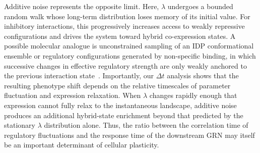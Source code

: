 \documentclass[11pt]{article}
\begin{document}
Additive noise represents the opposite limit. Here, $\lambda$ undergoes a bounded random walk whose long-term distribution loses memory of its initial value. For inhibitory interactions, this progressively increases access to weakly repressive configurations and drives the system toward hybrid co-expression states. A possible molecular analogue is unconstrained sampling of an IDP conformational ensemble or regulatory configurations generated by non-specific binding, in which successive changes in effective regulatory strength are only weakly anchored to the previous interaction state~\cite{Ferrie2022Structure-functionRegulation, Holehouse2023TheRegions}. Importantly, our $\Delta t$ analysis shows that the resulting phenotype shift depends on the relative timescales of parameter fluctuation and expression relaxation. When $\lambda$ changes rapidly enough that expression cannot fully relax to the instantaneous landscape, additive noise produces an additional hybrid-state enrichment beyond that predicted by the stationary $\lambda$ distribution alone. Thus, the ratio between the correlation time of regulatory fluctuations and the response time of the downstream GRN may itself be an important determinant of cellular plasticity.
\end{document}
